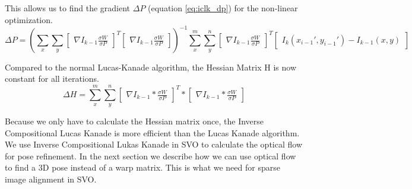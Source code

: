 \documentclass[11pt,a4paper,titlepage,oneside]{report}
\begin{document}
This allows us to find the gradient $\Delta P$ (equation \ref{eq:iclk_dp}) for the non-linear optimization.
\tiny
\begin{equation}\label{eq:iclk_dp}
  \Delta P=(\sum_x\sum_y\begin{bmatrix}\nabla I_{k-1}\frac{\sigma W}{\sigma P}\end{bmatrix}^T\begin{bmatrix}\nabla I_{k-1}\frac{\sigma W}{\sigma P}\end{bmatrix})^{-1}
  \sum_x^m\sum_y^n\begin{bmatrix}\nabla I_{k-1}\frac{\sigma W}{\sigma P}\end{bmatrix}^T\begin{bmatrix}I_{k}(x_{i-1}',y_{i-1}') - I_{k-1}(x,y)\end{bmatrix}
\end{equation}
\normalsize

Compared to the normal Lucas-Kanade algorithm, the Hessian Matrix H is now constant for all iterations.
\begin{equation}
  \Delta H=\sum_x^m\sum_y^n\begin{bmatrix}\nabla I_{k-1}*\frac{\sigma W}{\sigma P}\end{bmatrix}^T*\begin{bmatrix}\nabla I_{k-1}*\frac{\sigma W}{\sigma P}\end{bmatrix}
\end{equation}

Because we only have to calculate the Hessian matrix once, the Inverse Compositional Lucas Kanade is more efficient than the Lucas Kanade algorithm.\\
We use Inverse Compositional Lukas Kanade in SVO to calculate the optical flow for pose refinement. In the next section we describe how we can use optical flow to find a 3D pose instead of a warp matrix. This is what we need for sparse image alignment in SVO.
\end{document}
